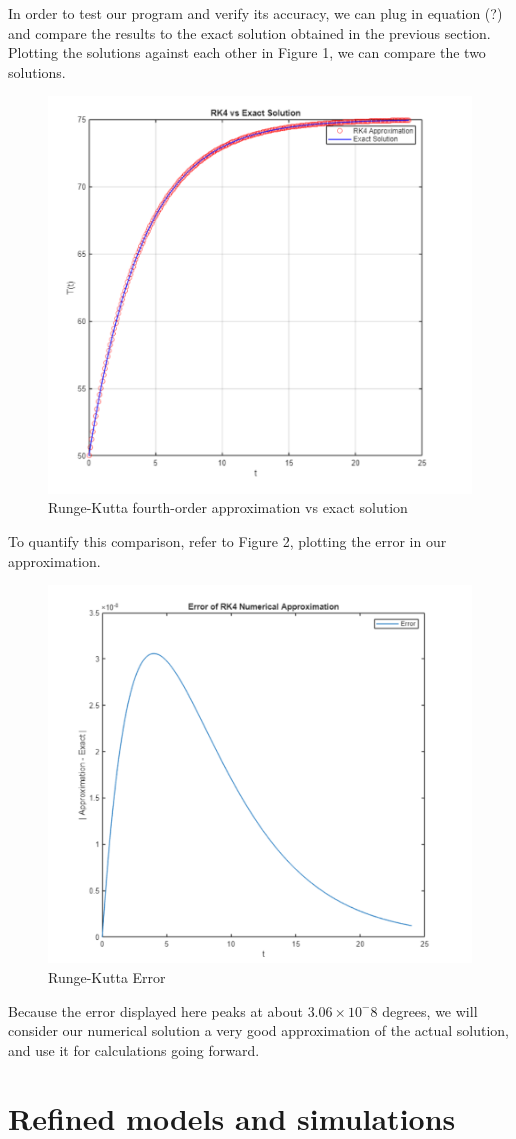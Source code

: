 \documentclass[12pt]{article}
\begin{document}
In order to test our program and verify its accuracy, we can plug in equation (?) and compare the results to the exact solution obtained in the previous section. Plotting the solutions against each other in Figure 1, we can compare the two solutions.

\begin{figure}[H]
     \centering
    \includegraphics[width=0.5\linewidth]{Screenshot 2025-09-29 180223.png}
    \caption{Runge-Kutta fourth-order approximation vs exact solution}
    \label{fig:placeholder}
\end{figure}
   

To quantify this comparison, refer to Figure 2, plotting the error in our approximation. 

\begin{figure}[H]
    \centering
    \includegraphics[width=0.5\linewidth]{Screenshot 2025-09-29 181115.png}
    \caption{Runge-Kutta Error}
    \label{fig:placeholder}
\end{figure}

Because the error displayed here peaks at about $3.06\times10^-8$ degrees, we will consider our numerical solution a very good approximation of the actual solution, and use it for calculations going forward. 


\section{Refined models and simulations}
\end{document}
